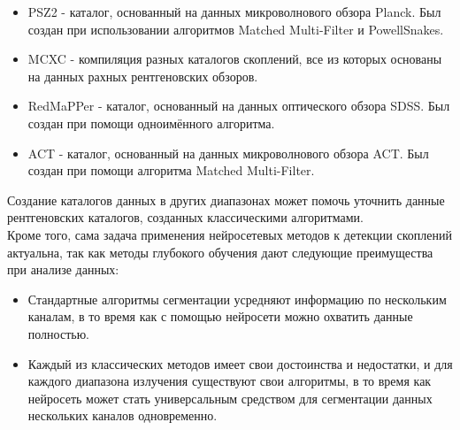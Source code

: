 \begin{itemize}
\item PSZ2 - каталог, основанный на данных микроволнового обзора Planck. Был создан при 
    использовании алгоритмов Matched Multi-Filter и PowellSnakes.\\

\item MCXC - компиляция разных каталогов скоплений, все из которых основаны на данных рахных
    рентгеновских обзоров.\\

\item RedMaPPer - каталог, основанный на данных оптического обзора SDSS. Был создан при помощи 
    одноимённого алгоритма.\\

\item ACT - каталог, основанный на данных микроволнового обзора ACT. Был создан при помощи 
    алгоритма Matched Multi-Filter.\\
\end{itemize}

Создание каталогов данных в других диапазонах может помочь уточнить данные рентгеновских каталогов,
созданных классическими алгоритмами.\\

Кроме того, сама задача применения нейросетевых методов к детекции скоплений актуальна, так как 
методы глубокого обучения дают следующие преимущества при анализе данных:\\
\begin{itemize}
    \item Стандартные алгоритмы сегментации усредняют информацию по нескольким каналам, в то время 
        как с помощью нейросети можно охватить данные полностью.\\ 
    \item Каждый из классических методов имеет свои достоинства и недостатки, и для каждого 
        диапазона излучения существуют свои алгоритмы, в то время как нейросеть может стать 
        универсальным средством для сегментации данных нескольких каналов одновременно.\\
\end{itemize}


